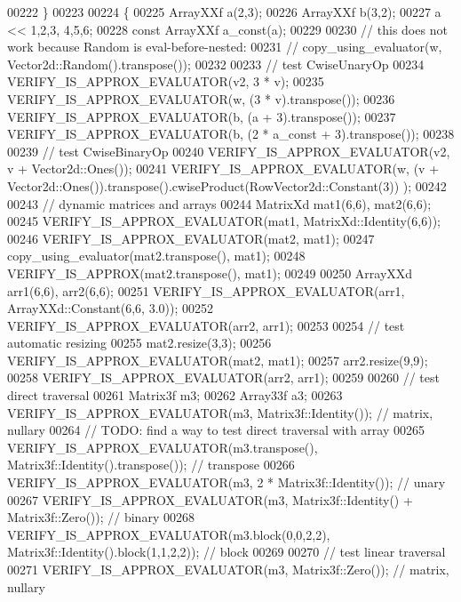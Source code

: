 \begin{DoxyCode}
00222   \}
00223 
00224   \{
00225     ArrayXXf a(2,3);
00226     ArrayXXf b(3,2);
00227     a << 1,2,3, 4,5,6;
00228     \textcolor{keyword}{const} ArrayXXf a\_const(a);
00229     
00230     \textcolor{comment}{// this does not work because Random is eval-before-nested: }
00231     \textcolor{comment}{// copy\_using\_evaluator(w, Vector2d::Random().transpose());}
00232 
00233     \textcolor{comment}{// test CwiseUnaryOp}
00234     VERIFY\_IS\_APPROX\_EVALUATOR(v2, 3 * v);
00235     VERIFY\_IS\_APPROX\_EVALUATOR(w, (3 * v).transpose());
00236     VERIFY\_IS\_APPROX\_EVALUATOR(b, (a + 3).transpose());
00237     VERIFY\_IS\_APPROX\_EVALUATOR(b, (2 * a\_const + 3).transpose());
00238 
00239     \textcolor{comment}{// test CwiseBinaryOp}
00240     VERIFY\_IS\_APPROX\_EVALUATOR(v2, v + Vector2d::Ones());
00241     VERIFY\_IS\_APPROX\_EVALUATOR(w, (v + Vector2d::Ones()).transpose().cwiseProduct(RowVector2d::Constant(3))
      );
00242 
00243     \textcolor{comment}{// dynamic matrices and arrays}
00244     MatrixXd mat1(6,6), mat2(6,6);
00245     VERIFY\_IS\_APPROX\_EVALUATOR(mat1, MatrixXd::Identity(6,6));
00246     VERIFY\_IS\_APPROX\_EVALUATOR(mat2, mat1);
00247     copy\_using\_evaluator(mat2.transpose(), mat1);
00248     VERIFY\_IS\_APPROX(mat2.transpose(), mat1);
00249 
00250     ArrayXXd arr1(6,6), arr2(6,6);
00251     VERIFY\_IS\_APPROX\_EVALUATOR(arr1, ArrayXXd::Constant(6,6, 3.0));
00252     VERIFY\_IS\_APPROX\_EVALUATOR(arr2, arr1);
00253     
00254     \textcolor{comment}{// test automatic resizing}
00255     mat2.resize(3,3);
00256     VERIFY\_IS\_APPROX\_EVALUATOR(mat2, mat1);
00257     arr2.resize(9,9);
00258     VERIFY\_IS\_APPROX\_EVALUATOR(arr2, arr1);
00259 
00260     \textcolor{comment}{// test direct traversal}
00261     Matrix3f m3;
00262     Array33f a3;
00263     VERIFY\_IS\_APPROX\_EVALUATOR(m3, Matrix3f::Identity());  \textcolor{comment}{// matrix, nullary}
00264     \textcolor{comment}{// TODO: find a way to test direct traversal with array}
00265     VERIFY\_IS\_APPROX\_EVALUATOR(m3.transpose(), Matrix3f::Identity().transpose());  \textcolor{comment}{// transpose}
00266     VERIFY\_IS\_APPROX\_EVALUATOR(m3, 2 * Matrix3f::Identity());  \textcolor{comment}{// unary}
00267     VERIFY\_IS\_APPROX\_EVALUATOR(m3, Matrix3f::Identity() + Matrix3f::Zero());  \textcolor{comment}{// binary}
00268     VERIFY\_IS\_APPROX\_EVALUATOR(m3.block(0,0,2,2), Matrix3f::Identity().block(1,1,2,2));  \textcolor{comment}{// block}
00269 
00270     \textcolor{comment}{// test linear traversal}
00271     VERIFY\_IS\_APPROX\_EVALUATOR(m3, Matrix3f::Zero());  \textcolor{comment}{// matrix, nullary}

\end{DoxyCode}
